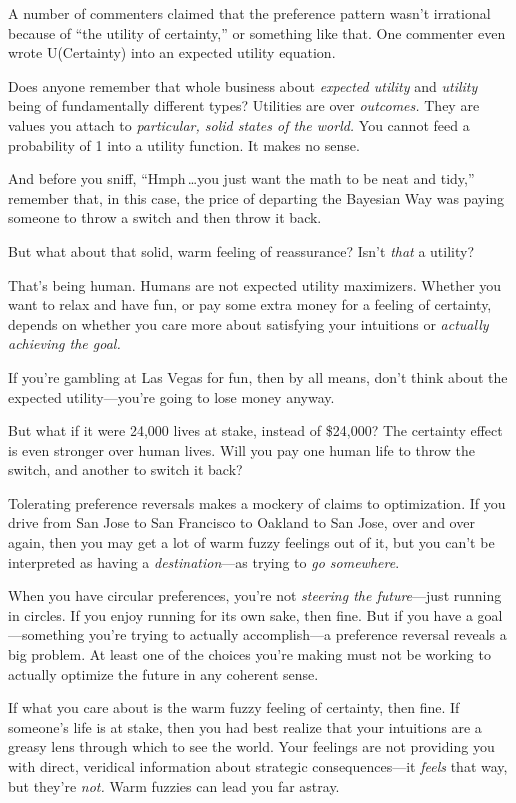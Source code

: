  A number of commenters claimed that the preference pattern
wasn't irrational because of ``the
utility of certainty,'' or something like that. One
commenter even wrote U(Certainty) into an expected utility equation.


 Does anyone remember that whole business about \textit{expected
utility} and \textit{utility} being of fundamentally different types?
Utilities are over \textit{outcomes.} They are values you attach to
\textit{particular, solid states of the world.} You cannot feed a
probability of 1 into a utility function. It makes no sense.


 And before you sniff, ``Hmph\,\ldots you just want
the math to be neat and tidy,'' remember that, in
this case, the price of departing the Bayesian Way was paying someone
to throw a switch and then throw it back.


 But what about that solid, warm feeling of reassurance?
Isn't \textit{that} a utility?

{
 That's being human. Humans are not expected
utility maximizers. Whether you want to relax and have fun, or pay some
extra money for a feeling of certainty, depends on whether you care
more about satisfying your intuitions or \textit{actually achieving the
goal.}}


 If you're gambling at Las Vegas for fun, then by
all means, don't think about the expected
utility---you're going to lose money anyway.


 But what if it were 24,000 lives at stake, instead of \$24,000?
The certainty effect is even stronger over human lives. Will you pay
one human life to throw the switch, and another to switch it back?


 Tolerating preference reversals makes a mockery of claims to
optimization. If you drive from San Jose to San Francisco to Oakland to
San Jose, over and over again, then you may get a lot of warm fuzzy
feelings out of it, but you can't be interpreted as
having a \textit{destination}{}---as trying to \textit{go somewhere}.


 When you have circular preferences, you're not
\textit{steering the future}{}---just running in circles. If you enjoy
running for its own sake, then fine. But if you have a goal---something
you're trying to actually accomplish---a preference
reversal reveals a big problem. At least one of the choices
you're making must not be working to actually optimize
the future in any coherent sense.


 If what you care about is the warm fuzzy feeling of certainty,
then fine. If someone's life is at stake, then you had
best realize that your intuitions are a greasy lens through which to
see the world. Your feelings are not providing you with direct,
veridical information about strategic consequences---it \textit{feels}
that way, but they're \textit{not.} Warm fuzzies can
lead you far astray.


